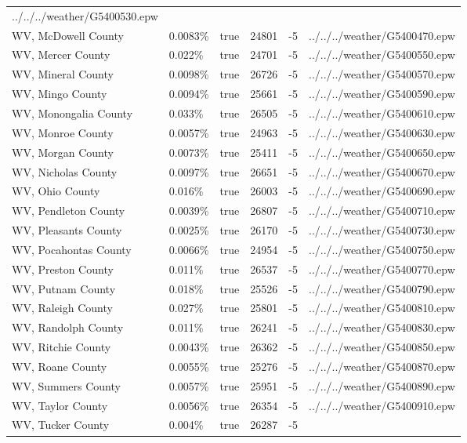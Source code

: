 \begin{longtable}[]{@{}llllll@{}}
../../../weather/G5400530.epw \\
WV, McDowell County & 0.0083\% & true & 24801 & -5 &
../../../weather/G5400470.epw \\
WV, Mercer County & 0.022\% & true & 24701 & -5 &
../../../weather/G5400550.epw \\
WV, Mineral County & 0.0098\% & true & 26726 & -5 &
../../../weather/G5400570.epw \\
WV, Mingo County & 0.0094\% & true & 25661 & -5 &
../../../weather/G5400590.epw \\
WV, Monongalia County & 0.033\% & true & 26505 & -5 &
../../../weather/G5400610.epw \\
WV, Monroe County & 0.0057\% & true & 24963 & -5 &
../../../weather/G5400630.epw \\
WV, Morgan County & 0.0073\% & true & 25411 & -5 &
../../../weather/G5400650.epw \\
WV, Nicholas County & 0.0097\% & true & 26651 & -5 &
../../../weather/G5400670.epw \\
WV, Ohio County & 0.016\% & true & 26003 & -5 &
../../../weather/G5400690.epw \\
WV, Pendleton County & 0.0039\% & true & 26807 & -5 &
../../../weather/G5400710.epw \\
WV, Pleasants County & 0.0025\% & true & 26170 & -5 &
../../../weather/G5400730.epw \\
WV, Pocahontas County & 0.0066\% & true & 24954 & -5 &
../../../weather/G5400750.epw \\
WV, Preston County & 0.011\% & true & 26537 & -5 &
../../../weather/G5400770.epw \\
WV, Putnam County & 0.018\% & true & 25526 & -5 &
../../../weather/G5400790.epw \\
WV, Raleigh County & 0.027\% & true & 25801 & -5 &
../../../weather/G5400810.epw \\
WV, Randolph County & 0.011\% & true & 26241 & -5 &
../../../weather/G5400830.epw \\
WV, Ritchie County & 0.0043\% & true & 26362 & -5 &
../../../weather/G5400850.epw \\
WV, Roane County & 0.0055\% & true & 25276 & -5 &
../../../weather/G5400870.epw \\
WV, Summers County & 0.0057\% & true & 25951 & -5 &
../../../weather/G5400890.epw \\
WV, Taylor County & 0.0056\% & true & 26354 & -5 &
../../../weather/G5400910.epw \\
WV, Tucker County & 0.004\% & true & 26287 & -5 &

\end{longtable}
